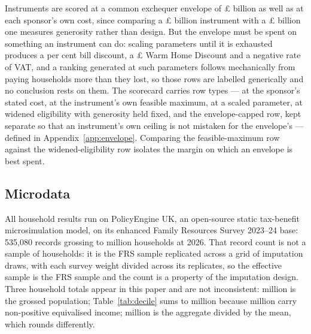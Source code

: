 Instruments are scored at a common exchequer envelope of \pounds \genEnvelopeBn{} billion as well as at each sponsor's own cost, since comparing a \pounds \genVatCutCostBn{} billion instrument with a \pounds \genRebateCostBn{} billion one measures generosity rather than design. But the envelope must be spent on something an instrument can do: scaling parameters until it is exhausted produces a \genSocialTariffScaledParameterPct{} per cent bill discount, a \pounds \genWhdScaledParameterGbp{} Warm Home Discount and a negative rate of VAT, and a ranking generated at such parameters follows mechanically from paying households more than they lost, so those rows are labelled generically and no conclusion rests on them. The scorecard carries \genEnvelopeRowKindCount{} row types --- at the sponsor's stated cost, at the instrument's own feasible maximum, at a scaled parameter, at widened eligibility with generosity held fixed, and the envelope-capped row, kept separate so that an instrument's own ceiling is not mistaken for the envelope's --- defined in Appendix~\ref{app:envelope}. Comparing the feasible-maximum row against the widened-eligibility row isolates the margin on which an envelope is best spent.

\subsection{Microdata}
\label{sec:data}

All household results run on PolicyEngine UK, an open-source static tax-benefit microsimulation model, on its enhanced Family Resources Survey 2023--24 base: 535{,}080 records grossing to \genTotalHouseholdsM{} million households at 2026. That record count is not a sample of households: it is the FRS sample replicated across a grid of imputation draws, with each survey weight divided across its replicates, so the effective sample is the FRS sample and the count is a property of the imputation design. Three household totals appear in this paper and are not inconsistent: \genTotalHouseholdsM{} million is the grossed population; Table~\ref{tab:decile} sums to \genCoveredHouseholdsM{} million because \genCoverageExcludedHouseholdsM{} million carry non-positive equivalised income; \genTotalHouseholdsMFromMean{} million is the aggregate divided by the mean, which rounds differently.

